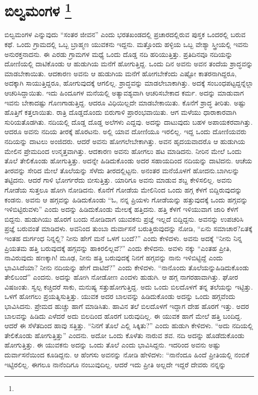 
\chapter[ಬಿಲ್ವಮಂಗಳ ]{ಬಿಲ್ವಮಂಗಳ \protect\footnote{}}

ಬಿಲ್ವಮಂಗಳ ಎನ್ನುವುದು “ಸಂತರ ಜೀವನ” ಎಂದು ಭರತಖಂಡದಲ್ಲಿ ಪ್ರಚಾರದಲ್ಲಿರುವ ಪುಸ್ತಕ ಒಂದರಲ್ಲಿ ಬರುವ ಕಥೆ. ಒಂದು ಗ್ರಾಮದಲ್ಲಿ ಒಬ್ಬ ಬ್ರಾಹ್ಮಣ ಯುವಕನು ಇದ್ದನು. ಮತ್ತೊಂದು ಹಳ್ಳಿಯ ಒಬ್ಬ ವೇಶ್ಯಾ ಸ್ತ್ರೀಯಲ್ಲಿ ಇವನು ಅನುರಕ್ತನಾದನು. ಈ ಎರಡು ಗ್ರಾಮಗಳ ಮಧ್ಯೆ ಒಂದು ದೊಡ್ಡ ನದಿ ಹರಿಯುತ್ತಿತ್ತು. ಪ್ರತಿದಿನವೂ ನದಿಯನ್ನು ದೋಣಿಯಲ್ಲಿ ದಾಟಿಕೊಂಡು ಆ ಹುಡುಗಿಯ ಮನೆಗೆ ಹೋಗುತ್ತಿದ್ದ. ಒಂದು ದಿನ ಅವನು ಅವನ ತಂದೆಯ ಶ್ರಾದ್ಧವನ್ನು ಮಾಡಬೇಕಾಯಿತು. ಆದಕಾರಣ ಅವನು ಆ ಹುಡುಗಿಯ ಮನೆಗೆ ಹೋಗಬೇಕೆಂದು ಎಷ್ಟೋ ಕಾತರನಾಗಿದ್ದರೂ, ಅದಕ್ಕಾಗಿ ಸಾಯುತ್ತಿದ್ದರೂ, ಹೋಗುವುದಕ್ಕೆ ಆಗಲಿಲ್ಲ. ಶ್ರಾದ್ಧವನ್ನು ಮಾಡಲೇಬಾಕಾಗಿತ್ತು. ಅದಕ್ಕೆ ಸಂಬಂಧಪಟ್ಟದ್ದನ್ನೆಲ್ಲಾ ಆಚರಿಸಿದ್ದಾಯಿತು. ಇದು ಹಿಂದೂಗಳ ಮನೆಯಲ್ಲಿ ಅತ್ಯಾವಶ್ಯವಾಗಿ ಆಚರಿಸಬೇಕಾದ ಕರ್ಮ. ಅದನ್ನು ಮಾಡುವಾಗ ಇವನು ಬೇಕಾದಷ್ಟು ಗೊಣಗಾಡುತ್ತಿದ್ದ. ಆದರೂ ವಿಧಿ\-ಯಿಲ್ಲದೇ ಮಾಡಬೇಕಾಯಿತು. ಕೊನೆಗೆ ಶ್ರಾದ್ಧ ತೀರಿತು. ಅಷ್ಟು ಹೊತ್ತಿಗೆ ಕತ್ತಲಾಯಿತು. ರಾತ್ರಿ ದೊಡ್ಡದೊಂದು ಬಿರುಗಾಳಿ ಪ್ರಾರಂಭವಾಯಿತು. ಆಗ ಮಳೆಯು ಧಾರಾಕಾರವಾಗಿ ಸುರಿಯತೊಡಗಿತು. ನದಿಯಲ್ಲಿ ದೊಡ್ಡ ದೊಡ್ಡ ಅಲೆಗಳು ಎದ್ದವು. ಅದನ್ನು ದಾಟುವುದು ಬಹಳ ಅಪಾಯಕರವಾಗಿತ್ತು. ಆದರೂ ಅವನು ನದಿಯ ತೀರಕ್ಕೆ ಹೊರಟನು. ಅಲ್ಲಿ ಯಾವ ದೋಣಿಯೂ ಇರಲಿಲ್ಲ. ಇದ್ದ ಒಂದು ದೋಣಿಯವರು ನದಿಯನ್ನು ದಾಟಲು ಅಂಜಿದರು. ಆದರೆ ಅವನು ಹೋಗಲೇಬೇಕಾಗಿತ್ತು. ಅವನ ಹೃದಯವಾದರೊ ಆ ಹುಡುಗಿಯ ಮೇಲಿನ ಪ್ರೇಮದಿಂದ ಉನ್ಮತ್ತವಾಗಿತ್ತು. ಆದಕಾರಣ ಅವನು ಹೋಗಲು ಹಟ ಮಾಡಿದನು. ನೀರಿನ ಮೇಲೆ ಒಂದು ತೊಲೆ ತೇಲಿಕೊಂಡು ಹೋಗುತ್ತಿತ್ತು. ಅದನ್ನೇ ಹಿಡಿದುಕೊಂಡು ಅದರ ಸಹಾಯದಿಂದ ನದಿಯನ್ನು ದಾಟಿದನು. ಆಚೆಯ ತೀರವನ್ನು ಸೇರಿದ ಮೇಲೆ ತೊಲೆಯನ್ನು ಸೆಳೆದು ತೀರದಲ್ಲಿಟ್ಟನು. ಅನಂತರ ಮನೆಯೊಳಗೆ ಹೋದನು.\break ಬಾಗಿಲನ್ನು ತಟ್ಟಿದನು. ಆದರೆ ಗಾಳಿ ಭೋರ್ಗರೆದು ಬೀಸುತ್ತಿತ್ತು. ಯಾರಿಗೂ ಅವನು ಮಾಡುವ ಶಬ್ದ ಕೇಳಿಸಲಿಲ್ಲ. ಅವನು ಗೋಡೆಯ ಸುತ್ತಲೂ ಹೋಗಿ ನೋಡಿದನು. ಕೊನೆಗೆ ಗೋಡೆಯ ಮೇಲಿನಿಂದ ಒಂದು ಹಗ್ಗ ಕೆಳಗೆ ಬಿದ್ದಿರುವುದನ್ನು ಕಂಡನು. ಅವನು ಆ ಹಗ್ಗವನ್ನು ಹಿಡಿದುಕೊಂಡು “ಓ, ನನ್ನ ಪ್ರಿಯಳು ಗೋಡೆಯನ್ನು ಹತ್ತುವುದಕ್ಕೆ ಒಂದು ಹಗ್ಗವನ್ನು ಇಳಿಬಿಟ್ಟಿರುವಳು” ಎಂದು ಅದನ್ನು ಹಿಡಿದುಕೊಂಡು ಮೇಲಕ್ಕೆ ಹತ್ತಿದನು. ಹತ್ತಿ ಕೆಳಗೆ ಇಳಿಯು\-ವಾಗ ಜಾರಿ ಕೆಳಗೆ ಬಿದ್ದನು. ಹುಡುಗಿಯು ಹೊರಗೆ ಬಂದು ನೋಡಿದಾಗ ಯುವಕನು ಪ್ರಜ್ಞೆ ಇಲ್ಲದೆ ಬಿದ್ದಿದ್ದನು. ಅವನನ್ನು ಉಪಚರಿಸಿ ಪ್ರಜ್ಞೆ ಬರುವಂತೆ ಮಾಡಿದಳು. ಅವನಿಂದ ತುಂಬಾ ದುರ್ವಾಸನೆ ಬರುತ್ತಿರುವುದನ್ನು ನೋಡಿ, “ಏನು ಸಮಾಚಾರ?\break ಏತಕ್ಕೆ ಇಂತಹ ದುರ್ಗಂಧ ನಿನ್ನಲ್ಲಿ? ನೀನು ಹೇಗೆ ಮನೆ ಒಳಗೆ ಬಂದೆ?” ಎಂದು ಕೇಳಿದಳು. ಅವನು ಅದಕ್ಕೆ “ನೀನು ನಿನ್ನ ಪ್ರಿಯತಮ ಹತ್ತಿ ಬರುವುದಕ್ಕೆ ಹಗ್ಗವನ್ನು ಹಾಕಿರಲಿಲ್ಲವೆ?” ಎಂದು ಕೇಳಿದನು. ಅವಳು ನಕ್ಕು “ಎಂತಹ ಪ್ರೀತಿ, ನಾವಿರುವುದು ಹಣಕ್ಕಾಗಿ! ಮೂಢ, ನೀನು ಹತ್ತಿ ಬರುವುದಕ್ಕೆ ನಿನಗೆ ಹಗ್ಗವನ್ನು ನಾನು ಇಳಿಬಿಟ್ಟಿದ್ದೆ ಎಂದು ಭಾವಿಸಿದೆಯಾ? ನೀನು ನದಿಯನ್ನು ಹೇಗೆ ದಾಟಿದೆ?” ಎಂದು ಕೇಳಿದಳು. “ನಾನೊಂದು ತೊಲೆಯನ್ನು\break ಹಿಡಿದುಕೊಂಡು ತೇಲಿಬಂದೆ” ಎಂದನು. ಅದನ್ನು ಹೋಗಿ ನೋಡೋಣ ಎಂದಳು ಹುಡುಗಿ. ಆ ಹಗ್ಗ ನಾಗರಹಾವಾಗಿತ್ತು. ಘೋರ ವಿಷಜಂತು. ಸ್ವಲ್ಪ ಕಚ್ಚಿದರೆ ಸಾಕು, ಮನುಷ್ಯ ಸತ್ತುಹೋಗುತ್ತಿದ್ದ. ಅದು ಒಂದು ಬಿಲದೊಳಗೆ ತನ್ನ ತಲೆಯನ್ನು ಇಟ್ಟಿತ್ತು. ಒಳಗೆ ಹೋಗಲು ಪ್ರಯತ್ನಿಸುತ್ತಿತ್ತು. ಯುವಕ ಅದರ ಬಾಲವನ್ನು ಹಿಡಿದುಕೊಂಡು ಅದನ್ನು ಒಂದು ಹಗ್ಗವೆಂದು ಭಾವಿಸಿದನು. ಪ್ರೇಮದ ಹುಚ್ಚು ಹಾಗೆ ಮಾಡಿಸಿತು. ಹಾವಿನ ತಲೆ ಬಿಲದೊಳಗೆ ಇದ್ದಾಗ ದೇಹ ಹೊರಗೆ ಇತ್ತು. ಅದರ ಬಾಲವನ್ನು ಹಿಡಿದು ಎಳೆದರೆ ಅದು ಬಿಲದಿಂದ ಹೊರಗೆ ಬರುವುದಿಲ್ಲ. ಈ ಯುವಕ ಹಾಗೆ ಮೇಲೆ ಹತ್ತಿ ಬಂದಿದ್ದ. ಆದರೆ ಈ ಸೆಳೆತದಿಂದ ಹಾವು ಸತ್ತಿತ್ತು. “ನಿನಗೆ ತೊಲೆ ಎಲ್ಲಿ ಸಿಕ್ಕಿತು?” ಎಂದು ಹುಡುಗಿ ಕೇಳಿದಳು. “ಅದು ನದಿಯಲ್ಲಿ ತೇಲಿಕೊಂಡು ಹೋಗುತ್ತಿತ್ತು” ಎಂದನು. ಅದೋ ಒಂದು ಕೊಳೆತು ನಾರುವ ಶವ. ನದಿ ಅದನ್ನು ಹೊಡೆದುಕೊಂಡು ಹೋಗುತ್ತಿತ್ತು. ಈ ಯುವಕನು ಅದನ್ನು ಒಂದು ತೊಲೆ ಎಂದು ಭಾವಿಸಿದ್ದನು. ಇದರಿಂದ ಅವನು ಅಷ್ಟು ದುರ್ವಾಸನೆಯಿಂದ ಕೂಡಿದ್ದನು. ಆ ಹೆಂಗಸು ಅವನನ್ನು ನೋಡಿ ಹೇಳಿದಳು: “ನಾನೆಂದೂ ಹಿಂದೆ ಪ್ರೀತಿಯಲ್ಲಿ ನಂಬಿಕೆ ಇಟ್ಟಿರಲಿಲ್ಲ. ಈಗಲೂ ನಾನೆಂದಿಗೂ ನಂಬುವುದಿಲ್ಲ. ಆದರೆ ಇದು ಪ್ರೀತಿ ಅಲ್ಲದೇ ಇದ್ದರೆ ದೇವರು ನನ್ನನ್ನು 